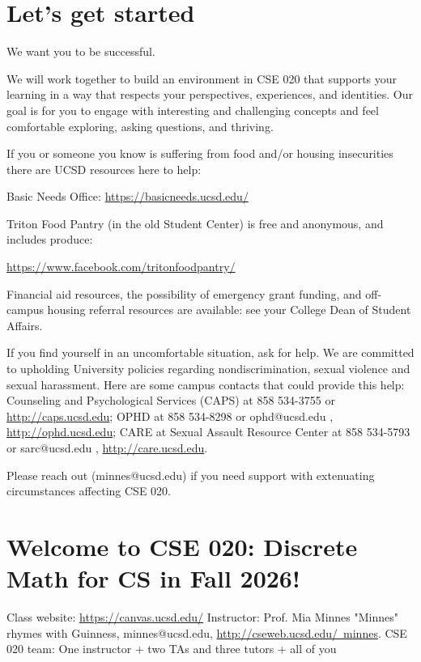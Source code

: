 
\section*{Let's get started}


We want you to be successful. 

We will work together to build an 
environment in CSE 020 that supports your learning
in a way that respects your
perspectives, experiences, and identities.
Our goal is for you to  engage
with interesting and challenging concepts and 
feel comfortable exploring, asking questions, and thriving.

If you or someone you know is suffering from food and/or housing insecurities 
there are UCSD resources here to help:

Basic Needs Office: \href{https://basicneeds.ucsd.edu/}{https://basicneeds.ucsd.edu/}

Triton Food Pantry (in the old Student Center)
is free and anonymous, and includes produce: 

\href{https://www.facebook.com/tritonfoodpantry/}{https://www.facebook.com/tritonfoodpantry/}

Financial aid resources, the possibility of emergency grant funding, and off-campus housing referral 
resources are available: see your College Dean of Student Affairs.

If you find yourself in an uncomfortable situation, ask for help. 
We are committed to upholding University policies regarding nondiscrimination, sexual violence and sexual harassment.
Here are some campus contacts that could provide this help: 
Counseling and Psychological Services (CAPS) at 858 534-3755 or \href{http://caps.ucsd.edu}{http://caps.ucsd.edu}; 
OPHD at 858 534-8298 or ophd@ucsd.edu , \href{http://ophd.ucsd.edu}{http://ophd.ucsd.edu};
CARE at Sexual Assault Resource Center at 858 534-5793 or sarc@ucsd.edu , \href{http://care.ucsd.edu}{http://care.ucsd.edu}.

Please reach out (minnes@ucsd.edu) if you need support with extenuating circumstances affecting CSE 020.

\vfill

\newpage
\section*{Welcome to CSE 020: Discrete Math for CS in Fall 2026!}
Class website: \href{https://canvas.ucsd.edu//}{https://canvas.ucsd.edu/}
Instructor: Prof. Mia Minnes {\tiny{"Minnes" rhymes with Guinness}}, minnes@ucsd.edu, 
\href{http://cseweb.ucsd.edu/~minnes}{http://cseweb.ucsd.edu/~minnes}.
CSE 020 team: One instructor + two TAs and three tutors + all of you

